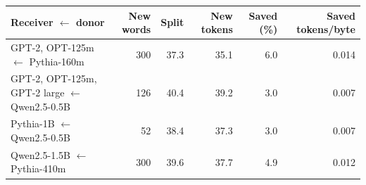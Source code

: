 \begin{tabular}{lrrrrr}
\toprule
Receiver $\leftarrow$ donor & New words & Split & New tokens & Saved (\%) & Saved tokens/byte \\
\midrule
GPT-2, OPT-125m $\leftarrow$ Pythia-160m & 300 & 37.3 & 35.1 & 6.0 & 0.014 \\
GPT-2, OPT-125m, GPT-2 large $\leftarrow$ Qwen2.5-0.5B & 126 & 40.4 & 39.2 & 3.0 & 0.007 \\
Pythia-1B $\leftarrow$ Qwen2.5-0.5B & 52 & 38.4 & 37.3 & 3.0 & 0.007 \\
Qwen2.5-1.5B $\leftarrow$ Pythia-410m & 300 & 39.6 & 37.7 & 4.9 & 0.012 \\
\bottomrule
\end{tabular}

